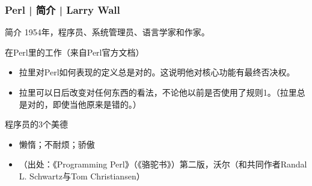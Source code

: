 \begin{frame}
  \frametitle{Perl | 简介 | Larry Wall}
  \begin{block}{简介}
    1954年，程序员、系统管理员、语言学家和作家。
  \end{block}
  \pause
  \begin{block}{在Perl里的工作（来自Perl官方文档）}
    \begin{itemize}
      \item 拉里对Perl如何表现的定义总是对的。这说明他对核心功能有最终否决权。
      \item 拉里可以日后改变对任何东西的看法，不论他以前是否使用了规则1。（拉里总是对的，即使当他原来是错的。）
    \end{itemize}
  \end{block}
  \pause
  \begin{block}{程序员的3个美德}
    \begin{itemize}
      \item 懒惰；不耐烦；骄傲
      \item （出处：《Programming Perl》（《骆驼书》）第二版，沃尔（和共同作者Randal L.  Schwartz与Tom Christiansen）
    \end{itemize}
  \end{block}
\end{frame}

